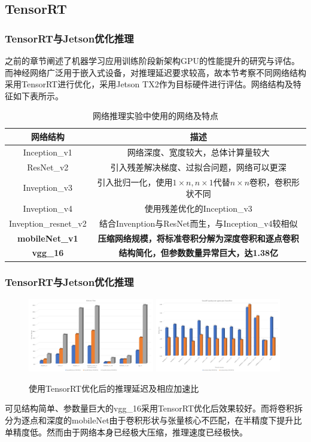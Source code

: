 \documentclass[10pt,aspectratio=169,mathserif]{beamer}
\begin{document}
	\subsection{TensorRT}
	\begin{frame}
		\frametitle{TensorRT与Jetson优化推理}
		之前的章节阐述了机器学习应用训练阶段新架构GPU的性能提升的研究与评估。而神经网络广泛用于嵌入式设备，对推理延迟要求较高，故本节考察不同网络结构采用TensorRT进行优化，采用Jetson TX2作为目标硬件进行评估。网络结构及特征如下表所示。
		\begin{table}
			\centering
			\caption{网络推理实验中使用的网络及特点}
			\begin{tabular}{cc}
				\toprule
				网络结构	&	描述\\
				\midrule
				Inception\_v1 & 网络深度、宽度较大，总体计算量较大\\
				ResNet\_v2 & 引入残差解决梯度、过拟合问题，网络可以更深\\
				Inveption\_v3 & 引入批归一化，使用$ 1\times n, n\times 1 $代替$ n\times n $卷积，卷积形状不同\\
				Inveption\_v4 & 使用残差优化的Inception\_v3\\
				Inveption\_resnet\_v2 & 结合Invenption与ResNet而生，与Inception\_v4较相似\\
				\textbf{mobileNet\_v1} & \textbf{压缩网络规模，将标准卷积分解为深度卷积和逐点卷积}\\
				\textbf{vgg\_16} &  \textbf{结构简化，但参数数量异常巨大，达1.38亿}\\
				\bottomrule
			\end{tabular} 
		\end{table}
		
	\end{frame}
	\begin{frame}
		\frametitle{TensorRT与Jetson优化推理}
		\begin{figure}
			\centering
			\includegraphics[width=5.5cm]{figures/TENSORRTRES.jpg}
			\includegraphics[width=5.5cm]{figures/TENSORRTRATIO.jpg}
			\caption{使用TensorRT优化后的推理延迟及相应加速比}\label{Fig.TENSORRT}
		\end{figure}
		可见结构简单、参数量巨大的vgg\_16采用TensorRT优化后效果较好。而将卷积拆分为逐点和深度的mobileNet由于卷积形状与张量核心不匹配，在半精度下提升比单精度低。然而由于网络本身已经极大压缩，推理速度已经极快。
	\end{frame}
	
\end{document}
